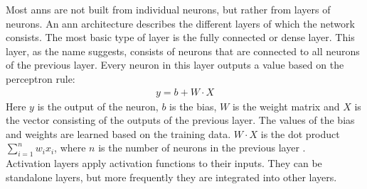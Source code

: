 Most \glspl{ann} are not built from individual neurons, but rather from layers of neurons. An \gls{ann} architecture describes the different layers of which the network consists. The most basic type of layer is the fully connected or dense layer. This layer, as the name suggests, consists of neurons that are connected to all neurons of the previous layer. Every neuron in this layer outputs a value based on the perceptron rule:
\begin{align*}
	y = b + W \cdot X
\end{align*} 
Here $y$ is the output of the neuron, $b$ is the bias, $W$ is the weight matrix and $X$ is the vector consisting of the outputs of the previous layer. The values of the bias and weights are learned based on the training data. $W \cdot X$ is the dot product $\sum_{i=1}^nw_ix_i$, where $n$ is the number of neurons in the previous layer \cite{perceptron_wikipedia}.\\

Activation layers apply activation functions to their inputs. They can be standalone layers, but more frequently they are integrated into other layers.\\ 

